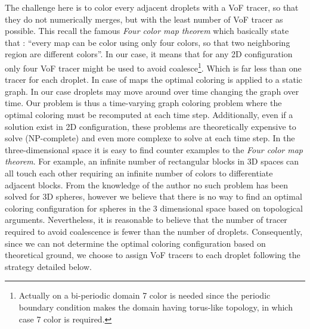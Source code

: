 The challenge here is to color every adjacent droplets with a VoF tracer, so that they do not numerically merges, but with the least number of VoF tracer as possible. 
This recall the famous \textit{Four color map theorem} \citep{kempe1879colours} which basically state that : 
\enquote{every map can be color using only four colors, so that two neighboring region are different colors}. 
In our case, it means that for any 2D configuration only four VoF tracer might be used to avoid coalesce\footnote{Actually on a bi-periodic domain 7 color is needed since the periodic boundary condition makes the domain having torus-like topology, in which case 7 color is required.  }. 
Which is far less than one tracer for each droplet. 
In case of maps the optimal coloring is applied to a static graph. 
In our case droplets may move around over time changing the graph over time. 
Our problem is thus a time-varying graph coloring problem where the optimal coloring must be recomputed at each time step.
Additionally, even if a solution exist in 2D configuration, these problems are theoretically expensive to solve (NP-complete) and even more complexe to solve at each time step.  
In the three-dimensional space it is easy to find counter examples to the \textit{Four color map theorem}. 
For example, an infinite number of rectangular blocks in 3D spaces can all touch each other requiring an infinite number of colors to differentiate adjacent blocks\citep{magnant2011coloring}. 
From the knowledge of the author no such problem has been solved for 3D spheres, however we believe that there is no way to find an optimal coloring configuration for spheres in the 3 dimensional space based on topological arguments. 
Nevertheless, it is reasonable to believe that the number of tracer required to avoid coalescence is fewer than the number of droplets.
Consequently, since we can not determine the optimal coloring configuration based on theoretical ground, we choose to assign VoF tracers to each droplet following the strategy detailed below.

